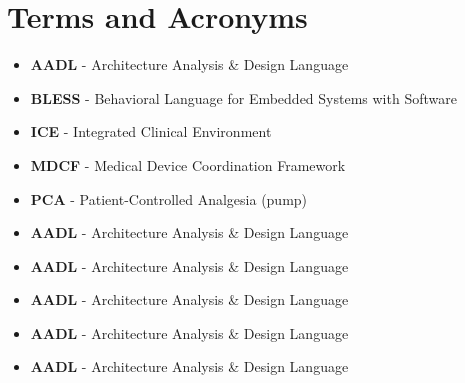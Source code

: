 \section{Terms and Acronyms}
\label{introduction:terms}

\begin{itemize}
	\item \textbf{AADL} - Architecture Analysis \& Design Language
	\item \textbf{BLESS} - Behavioral Language for Embedded Systems with Software
	\item \textbf{ICE} - Integrated Clinical Environment
	\item \textbf{MDCF} - Medical Device Coordination Framework
	\item \textbf{PCA} - Patient-Controlled Analgesia (pump)
	\item \textbf{AADL} - Architecture Analysis \& Design Language
	\item \textbf{AADL} - Architecture Analysis \& Design Language
	\item \textbf{AADL} - Architecture Analysis \& Design Language
	\item \textbf{AADL} - Architecture Analysis \& Design Language
	\item \textbf{AADL} - Architecture Analysis \& Design Language
\end{itemize}